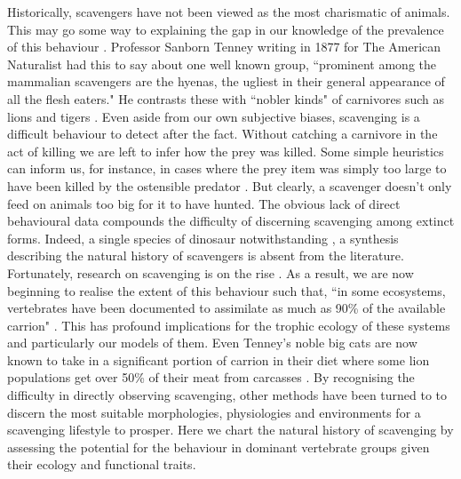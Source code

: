 \documentclass[a4paper,12pt]{article}
\begin{document}
Historically, scavengers have not been viewed as the most charismatic of animals.
This may go some way to explaining the gap in our knowledge of the prevalence of this behaviour \citep{devault2003scavenging}.
Professor Sanborn Tenney writing in 1877 for The American Naturalist had this to say about one well known group, ``prominent among the mammalian scavengers are the hyenas, the ugliest in their general appearance of all the flesh eaters."
He contrasts these with ``nobler kinds" of carnivores such as lions and tigers \citep{tenney1877few}.
Even aside from our own subjective biases, scavenging is a difficult behaviour to detect after the fact.
Without catching a carnivore in the act of killing we are left to infer how the prey was killed.
Some simple heuristics can inform us, for instance, in cases where the prey item was simply too large to have been killed by the ostensible predator \citep{pobiner2008paleoecological}.
But clearly, a scavenger doesn't only feed on animals too big for it to have hunted.
The obvious lack of direct behavioural data compounds the difficulty of discerning scavenging among extinct forms.
Indeed, a single species of dinosaur notwithstanding \citep{carbone2011intra}, a synthesis describing the natural history of scavengers is absent from the literature.
Fortunately, research on scavenging is on the rise \citep{manga2006vulture}.
As a result, we are now beginning to realise the extent of this behaviour such that, ``in some ecosystems, vertebrates have been documented to assimilate as much as 90\% of the available carrion" \citep{beasley2015vertebrates}.
This has profound implications for the trophic ecology of these systems and particularly our models of them.
Even Tenney’s noble big cats are now known to take in a significant portion of carrion in their diet where some lion populations get over 50\% of their meat from carcasses \citep{jones2015african}.
By recognising the difficulty in directly observing scavenging, other methods have been turned to to discern the most suitable morphologies, physiologies and environments for a scavenging lifestyle to prosper.
Here we chart the natural history of scavenging by assessing the potential for the behaviour in dominant vertebrate groups given their ecology and functional traits.
\end{document}
